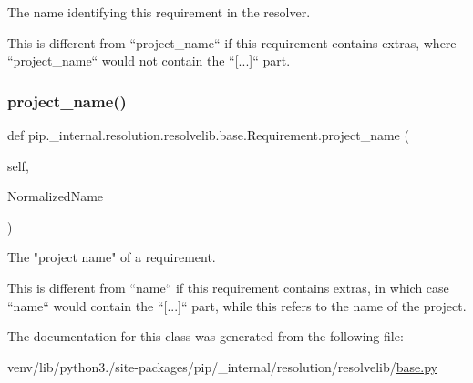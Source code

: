 \begin{DoxyVerb}The name identifying this requirement in the resolver.

This is different from ``project_name`` if this requirement contains
extras, where ``project_name`` would not contain the ``[...]`` part.
\end{DoxyVerb}
 \mbox{\label{classpip_1_1__internal_1_1resolution_1_1resolvelib_1_1base_1_1Requirement_aded87c50aa984abf5a73e7868becb448}} 
\subsubsection{\texorpdfstring{project\+\_\+name()}{project\_name()}}
{\footnotesize\ttfamily def pip.\+\_\+internal.\+resolution.\+resolvelib.\+base.\+Requirement.\+project\+\_\+name (\begin{DoxyParamCaption}\item[{}]{self,  }\item[{}]{Normalized\+Name }\end{DoxyParamCaption})}

\begin{DoxyVerb}The "project name" of a requirement.

This is different from ``name`` if this requirement contains extras,
in which case ``name`` would contain the ``[...]`` part, while this
refers to the name of the project.
\end{DoxyVerb}
 

The documentation for this class was generated from the following file\+:\begin{DoxyCompactItemize}
\item 
venv/lib/python3./site-\/packages/pip/\+\_\+internal/resolution/resolvelib/\hyperlink{__internal_2resolution_2resolvelib_2base_8py}{base.\+py}\end{DoxyCompactItemize}
